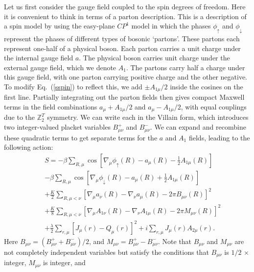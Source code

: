 \documentclass[prb,twocolumn]{revtex4-1}
\def\ztwot{\mathbb{Z}_2^T}
\newcommand{\cp}{$CP^1$ }
\begin{document}
Let us first consider the gauge field coupled to the spin degrees of freedom. Here it is convenient to think in terms of a parton description. This is a description of a spin model by using the easy-plane \cp model in which the phases $\phi_\uparrow$ and $\phi_\downarrow$ represent the phases of different types of bosonic `partons'. These partons each represent one-half of a physical boson. Each parton carries a unit charge under the internal gauge field $a$. The physical boson carries unit charge under the external gauge field, which we denote $A_1$. The partons carry half a charge under this gauge field, with one parton carrying positive charge and the other negative.
To modify Eq.~(\ref{sspin}) to reflect this, we add $\pm A_{1\mu}/2$ inside the cosines on the first line. 
Partially integrating out the parton fields then gives compact Maxwell terms in the field combinations $a_\mu+A_{1\mu}/2$ and $a_\mu-A_{1\mu}/2$, with equal couplings due to the $\ztwot$ symmetry. We can write each in the Villain form, which introduces two integer-valued placket variables $B^+_{\mu\nu}$ and $B^-_{\mu\nu}$. We can expand and recombine these quadratic terms to get separate terms for the $a$ and $A_1$ fields, leading to the following action:
\begin{eqnarray}
&&S=-\beta\sum_{R,\mu} \cos[\nabla_\mu\phi_\uparrow(R)-a_\mu(R)-\frac{1}{2}A_{1\mu}(R)]\nonumber\\
&&-\beta\sum_{R,\mu} \cos[\nabla_\mu\phi_\downarrow(R)-a_\mu(R)+\frac{1}{2}A_{1\mu}(R)]\nonumber\\
&&+\frac{K}{2}\sum_{R,\mu<\nu}\left[\nabla_\mu a_\nu(R)-\nabla_\nu a_\mu(R)-2\pi B_{\mu\nu}(R)\right]^2\nonumber\\
&&+\frac{K}{8}\sum_{R,\mu<\nu}\left[\nabla_\mu A_{1\nu}(R)-\nabla_\nu A_{1\mu}(R)-2\pi M_{\mu\nu}(R)\right]^2\nonumber\\
&&+\frac{\lambda}{2}\sum_{r,\mu} [ J_\mu(r)- Q_\mu(r)]^2+i\sum_{r,\mu}J_{\mu}(r)A_{2\mu}(r).
\label{withA}
\end{eqnarray}
Here $B_{\mu\nu}=(B^+_{\mu\nu}+B^-_{\mu\nu})/2$, and $M_{\mu\nu}=B^+_{\mu\nu}-B^-_{\mu\nu}$. Note that $B_{\mu\nu}$ and $M_{\mu\nu}$ are not completely independent variables but satisfy the conditions that $B_{\mu\nu}$ is $1/2$ $\times$ integer, $M_{\mu\nu}$ is integer, and 
\end{document}
